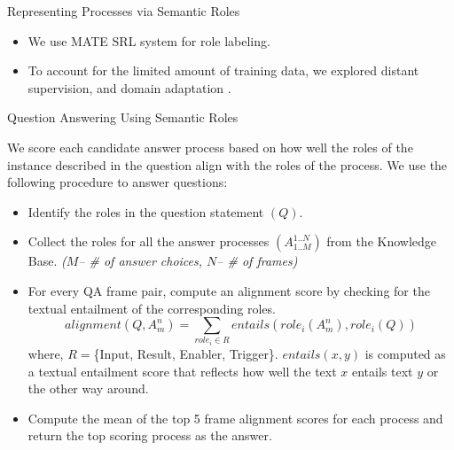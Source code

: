 \documentclass[final]{beamer}
\newlength{\onecolwid}
\begin{document}
\begin{frame}[t]
\begin{columns}[t]
\begin{column}{\onecolwid}
\begin{block}{Representing Processes via Semantic Roles}
\begin{itemize}
	\item We use MATE  SRL system \cite{bjorkelund2009multilingual} for role labeling.
	\item To account for the limited amount of training data, we explored distant supervision, and domain adaptation \cite{daume2009frustratingly}.
\end{itemize}



\end{block}


\begin{block}{Question Answering Using Semantic Roles}

We score each candidate answer process based on how well the roles of the instance described in the question align with the roles of the process. We use the following procedure to answer questions:\\
\begin{itemize}
\item Identify the roles in the question statement $(Q)$. 
\item Collect the roles for all the answer processes $(A_{1..M}^{1..N})$ from the Knowledge Base.
\emph{($M$-- \# of answer choices, $N$-- \# of frames)}\\
\item For every QA frame pair, compute an alignment score by checking for the textual entailment of the corresponding roles.
$$alignment(Q, A_m^n) = \sum_{role_i \in R} entails(role_i(A_m^n), role_i(Q))$$
where, $R =$\{Input, Result, Enabler, Trigger\}. $entails(x, y)$ is computed as a textual entailment score that reflects how well the text $x$ entails text $y$ or the other way around. 
\item Compute the mean of the top 5 frame alignment scores for each process and return the top scoring process as the answer.
\end{itemize}

\end{block}


\end{column} %


\end{columns}
\end{frame}
\end{document}
